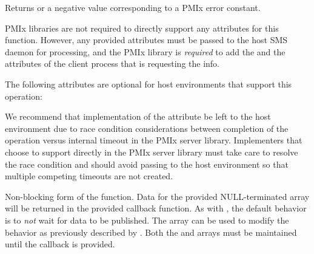 \begin{arglist}
\end{arglist}

Returns  or a negative value corresponding to a PMIx error constant.

\reqattrstart
\ac{PMIx} libraries are not required to directly support any attributes for this function. However, any provided attributes must be passed to the host \ac{SMS} daemon for processing, and the \ac{PMIx} library is \textit{required} to add the  and the  attributes of the client process that is requesting the info.

\reqattrend

\optattrstart
The following attributes are optional for host environments that support this operation:


\optattrend

\adviceimplstart
We recommend that implementation of the  attribute be left to the host environment due to race condition considerations between completion of the operation versus internal timeout in the \ac{PMIx} server library. Implementers that choose to support  directly in the \ac{PMIx} server library must take care to resolve the race condition and should avoid passing  to the host environment so that multiple competing timeouts are not created.
\adviceimplend


\descr

Non-blocking form of the  function.
Data for the provided NULL-terminated  array will be returned in the provided callback function.
As with , the default behavior is to \emph{not} wait for data to be published.
The  array can be used to modify the behavior as previously described by . Both the  and  arrays must be maintained until the callback is provided.



